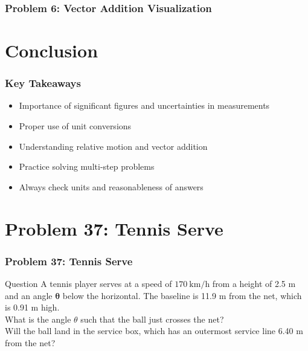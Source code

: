 \documentclass{beamer}
\begin{document}
\begin{frame}
\frametitle{Problem 6: Vector Addition Visualization}
\end{frame}

\section{Conclusion}

\begin{frame}
\frametitle{Key Takeaways}
\begin{itemize}
    \item Importance of significant figures and uncertainties in measurements
    \item Proper use of unit conversions
    \item Understanding relative motion and vector addition
    \item Practice solving multi-step problems
    \item Always check units and reasonableness of answers
\end{itemize}
\end{frame}

\section{Problem 37: Tennis Serve}

\begin{frame}
\frametitle{Problem 37: Tennis Serve}
\begin{block}{Question}
A tennis player serves at a speed of $170 \mathrm{~km} / \mathrm{h}$ from a height of 2.5 m and an angle $\boldsymbol{\theta}$ below the horizontal. The baseline is 11.9 m from the net, which is 0.91 m high.\\
What is the angle $\theta$ such that the ball just crosses the net?\\
Will the ball land in the service box, which has an outermost service line 6.40 m from the net?
\end{block}
\end{frame}
\end{document}
